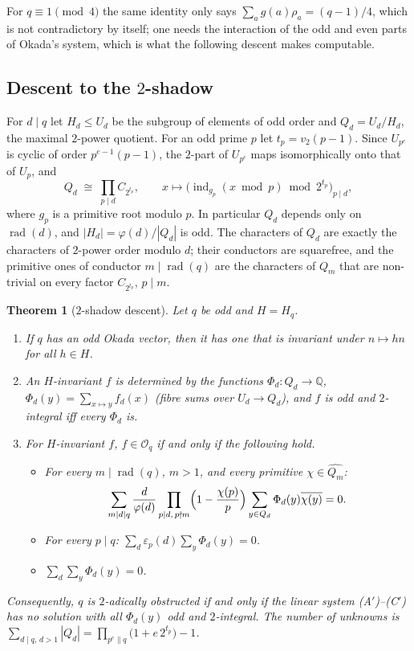 \documentclass[11pt]{amsart}
\newtheorem{theorem}{Theorem}[section]
\theoremstyle{definition}
\theoremstyle{remark}
\providecommand{\Q}{\mathbb Q}
\newcommand{\Ok}{\mathcal O}
\DeclareMathOperator{\rad}{rad}
\DeclareMathOperator{\ind}{ind}
\numberwithin{equation}{section}
\begin{document}
For $q\equiv1\pmod4$ the same identity only says $\sum_ag(a)\rho_a=(q-1)/4$, which is not contradictory by itself; one needs the interaction of the odd and even parts of Okada's system, which is what the following descent makes computable.

\subsection{\texorpdfstring{Descent to the $2$-shadow}{Descent to the 2-shadow}}
For $d\mid q$ let $H_d\le U_d$ be the subgroup of elements of odd order and $Q_d=U_d/H_d$, the maximal $2$-power quotient.
For an odd prime $p$ let $t_p=v_2(p-1)$.
Since $U_{p^e}$ is cyclic of order $p^{e-1}(p-1)$, the $2$-part of $U_{p^e}$ maps isomorphically onto that of $U_p$, and
\[
Q_d\;\cong\;\prod_{p\mid d}C_{2^{t_p}},\qquad x\mapsto\bigl(\ind_{g_p}(x\bmod p)\bmod 2^{t_p}\bigr)_{p\mid d},
\]
where $g_p$ is a primitive root modulo $p$.
In particular $Q_d$ depends only on $\rad(d)$, and $|H_d|=\varphi(d)/|Q_d|$ is odd.
The characters of $Q_d$ are exactly the characters of $2$-power order modulo $d$; their conductors are squarefree, and the primitive ones of conductor $m\mid\rad(q)$ are the characters of $Q_m$ that are non-trivial on every factor $C_{2^{t_p}}$, $p\mid m$.

\begin{theorem}[$2$-shadow descent]\label{thm:shadow}
Let $q$ be odd and $H=H_q$.
\begin{enumerate}
\item If $q$ has an odd Okada vector, then it has one that is invariant under $n\mapsto hn$ for all $h\in H$.
\item An $H$-invariant $f$ is determined by the functions $\Phi_d\colon Q_d\to\Q$, $\Phi_d(y)=\sum_{x\mapsto y}f_d(x)$ (fibre sums over $U_d\to Q_d$), and $f$ is odd and $2$-integral iff every $\Phi_d$ is.
\item For $H$-invariant $f$, $f\in\Ok_q$ if and only if the following hold.
\begin{itemize}
\item[(A$'$)] For every $m\mid\rad(q)$, $m>1$, and every primitive $\chi\in\widehat{Q_m}$:
\[
\sum_{m\mid d\mid q}\frac d{\varphi(d)}\prod_{p\mid d,\,p\nmid m}\Bigl(1-\frac{\chi(p)}p\Bigr)\sum_{y\in Q_d}\Phi_d(y)\overline{\chi(y)}=0 .
\]
\item[(B$'$)] For every $p\mid q$: $\sum_{d}\varepsilon_p(d)\sum_{y}\Phi_d(y)=0$.
\item[(C$'$)] $\sum_d\sum_y\Phi_d(y)=0$.
\end{itemize}
\end{enumerate}
Consequently, $q$ is $2$-adically obstructed if and only if the linear system \textup{(A$'$)--(C$'$)} has no solution with all $\Phi_d(y)$ odd and $2$-integral.
The number of unknowns is $\sum_{d\mid q,\,d>1}|Q_d|=\prod_{p^{e}\parallel q}\bigl(1+e\,2^{t_p}\bigr)-1$.
\end{theorem}
\end{document}

